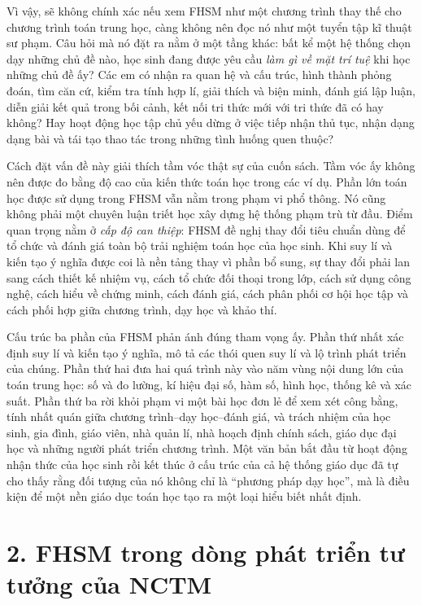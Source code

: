 Vì vậy, sẽ không chính xác nếu xem FHSM như một chương trình thay thế cho
chương trình toán trung học, càng không nên đọc nó như một tuyển tập kĩ thuật
sư phạm. Câu hỏi mà nó đặt ra nằm ở một tầng khác: bất kể một hệ thống chọn
dạy những chủ đề nào, học sinh đang được yêu cầu \emph{làm gì về mặt trí tuệ}
khi học những chủ đề ấy? Các em có nhận ra quan hệ và cấu trúc, hình thành
phỏng đoán, tìm căn cứ, kiểm tra tính hợp lí, giải thích và biện minh, đánh giá
lập luận, diễn giải kết quả trong bối cảnh, kết nối tri thức mới với tri thức
đã có hay không? Hay hoạt động học tập chủ yếu dừng ở việc tiếp nhận thủ tục,
nhận dạng dạng bài và tái tạo thao tác trong những tình huống quen thuộc?

Cách đặt vấn đề này giải thích tầm vóc thật sự của cuốn sách. Tầm vóc ấy
không nên được đo bằng độ cao của kiến thức toán học trong các ví dụ. Phần lớn
toán học được sử dụng trong FHSM vẫn nằm trong phạm vi phổ thông. Nó cũng
không phải một chuyên luận triết học xây dựng hệ thống phạm trù từ đầu. Điểm
quan trọng nằm ở \emph{cấp độ can thiệp}: FHSM đề nghị thay đổi tiêu chuẩn
dùng để tổ chức và đánh giá toàn bộ trải nghiệm toán học của học sinh. Khi
suy lí và kiến tạo ý nghĩa được coi là nền tảng thay vì phần bổ sung, sự thay
đổi phải lan sang cách thiết kế nhiệm vụ, cách tổ chức đối thoại trong lớp,
cách sử dụng công nghệ, cách hiểu về chứng minh, cách đánh giá, cách phân phối
cơ hội học tập và cách phối hợp giữa chương trình, dạy học và khảo thí.

Cấu trúc ba phần của FHSM phản ánh đúng tham vọng ấy. Phần thứ nhất xác định
suy lí và kiến tạo ý nghĩa, mô tả các thói quen suy lí và lộ trình phát triển
của chúng. Phần thứ hai đưa hai quá trình này vào năm vùng nội dung lớn của
toán trung học: số và đo lường, kí hiệu đại số, hàm số, hình học, thống kê và
xác suất. Phần thứ ba rời khỏi phạm vi một bài học đơn lẻ để xem xét công bằng,
tính nhất quán giữa chương trình--dạy học--đánh giá, và trách nhiệm của học
sinh, gia đình, giáo viên, nhà quản lí, nhà hoạch định chính sách, giáo dục đại
học và những người phát triển chương trình. Một văn bản bắt đầu từ hoạt động
nhận thức của học sinh rồi kết thúc ở cấu trúc của cả hệ thống giáo dục đã tự
cho thấy rằng đối tượng của nó không chỉ là ``phương pháp dạy học'', mà là
điều kiện để một nền giáo dục toán học tạo ra một loại hiểu biết nhất định.

\section*{2. FHSM trong dòng phát triển tư tưởng của NCTM}

